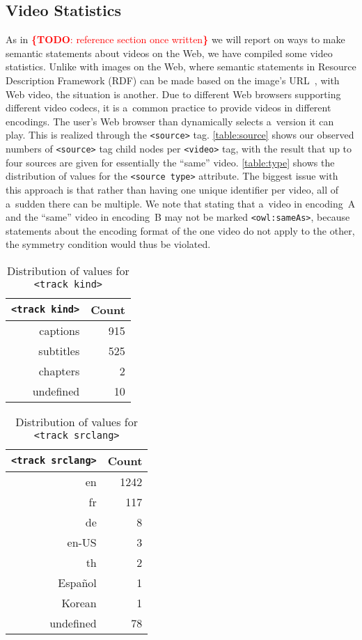 \documentclass{sig-alternate}
\newcommand{\todo}[1]{\noindent\textcolor{red}{{\bf \{TODO}: #1{\bf \}}}}
\begin{document}
\subsection{Video Statistics}

As in \todo{reference section once written}
we will report on ways to make semantic statements
about videos on the Web,
we have compiled some video statistics.
Unlike with images on the Web, where
semantic statements in
Resource Description Framework (RDF)
can be made based on the image's
URL~\cite{linsley2009rdfa},
with Web video, the situation is another.
Due to different Web browsers supporting
different video codecs,
it is a~common practice to provide videos
in different encodings.
The user's Web browser than dynamically selects
a~version it can play.
This is realized through the \texttt{<source>} tag.
\autoref{table:source} shows our observed numbers of
\texttt{<source>} tag child nodes per
\texttt{<video>} tag, with the result that up to
four sources are given for essentially the ``same'' video.
\autoref{table:type} shows the distribution
of values for the \texttt{<source type>} attribute.
The biggest issue with this approach is that
rather than having one unique identifier per video,
all of a~sudden there can be multiple.
We note that stating that a~video in encoding~A
and the ``same'' video in encoding~B
may not be marked \texttt{<owl:sameAs>},
because statements about the encoding format
of the one video do not apply to the other,
the symmetry condition would thus be violated.



\begin{table}[p]
  \centering
  \begin{tabular}{ r | r }                       
    \texttt{<track kind>} & Count \\
    \hline  
    captions & 915\\
    subtitles & 525\\
    chapters & 2\\
    undefined & 10\\  
  \end{tabular}
  \caption{Distribution of values for
    \texttt{<track kind>}}
  \label{table:kind}
\end{table}

\begin{table}[p]
  \centering
  \begin{tabular}{ r | r }                       
    \texttt{<track srclang>} & Count \\
    \hline  
    en & 1242\\
    fr & 117\\
    de & 8\\    
    en-US & 3\\
    th & 2\\
    Español & 1\\
    Korean & 1\\
    undefined & 78\\    
  \end{tabular}
  \caption{Distribution of values for
    \texttt{<track srclang>}}
  \label{table:srclang}    
\end{table}
\end{document}
